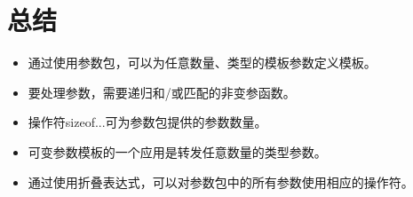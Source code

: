 \section{总结}

\begin{itemize}
\item 
通过使用参数包，可以为任意数量、类型的模板参数定义模板。

\item 
要处理参数，需要递归和/或匹配的非变参函数。

\item 
操作符sizeof...可为参数包提供的参数数量。

\item 
可变参数模板的一个应用是转发任意数量的类型参数。

\item 
通过使用折叠表达式，可以对参数包中的所有参数使用相应的操作符。
\end{itemize}